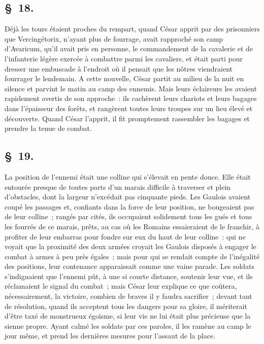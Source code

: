 \documentclass[french,twoside]{book} %
\begin{document}
\subsection[{§ 18.}]{ \textsc{§ 18.} }
\noindent Déjà les tours étaient proches du rempart, quand César apprit par des prisonniers que Vercingétorix, n’ayant plus de fourrage, avait rapproché son camp d’Avaricum, qu’il avait pris en personne, le commandement de la cavalerie et de l’infanterie légère exercée à combattre parmi les cavaliers, et était parti pour dresser une embuscade à l’endroit où il pensait que les nôtres viendraient fourrager le lendemain. A cette nouvelle, César partit au milieu de la nuit en silence et parvint le matin au camp des ennemis. Mais leurs éclaireurs les avaient rapidement avertis de son approche : ils cachèrent leurs chariots et leurs bagages dans l’épaisseur des forêts, et rangèrent toutes leurs troupes sur un lieu élevé et découverte. Quand César l’apprit, il fit promptement rassembler les bagages et prendre la tenue de combat.
\subsection[{§ 19.}]{ \textsc{§ 19.} }
\noindent La position de l’ennemi était une colline qui s’élevait en pente douce. Elle était entourée presque de toutes parts d’un marais difficile à traverser et plein d’obstacles, dont la largeur n’excédait pas cinquante pieds. Les Gaulois avaient coupé les passages et, confiants dans la force de leur position, ne bougeaient pas de leur colline ; rangés par cités, ils occupaient solidement tous les gués et tous les fourrés de ce marais, prêts, au cas où les Romains essaieraient de le franchir, à profiter de leur embarras pour fondre sur eux du haut de leur colline : qui ne voyait que la proximité des deux armées croyait les Gaulois disposés à engager le combat à armes à peu près égales ; mais pour qui se rendait compte de l’inégalité des positions, leur contenance apparaissait comme une vaine parade. Les soldats s’indignaient que l’ennemi pût, à une si courte distance, soutenir leur vue, et ils réclamaient le signal du combat ; mais César leur explique ce que coûtera, nécessairement, la victoire, combien de braves il y faudra sacrifier ; devant tant de résolution, quand ils acceptent tous les dangers pour sa gloire, il mériterait d’être taxé de monstrueux égoïsme, si leur vie ne lui était plus précieuse que la sienne propre. Ayant calmé les soldats par ces paroles, il les ramène au camp le jour même, et prend les dernières mesures pour l’assaut de la place.
\end{document}
